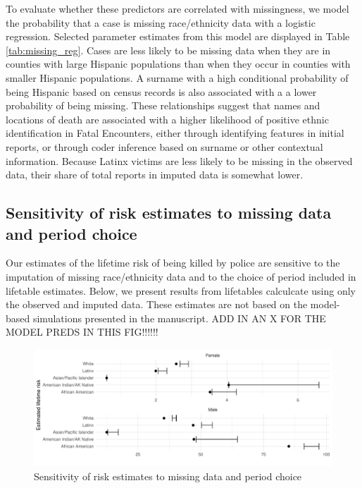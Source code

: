 \documentclass{article}
\begin{document}


To evaluate whether these predictors are correlated with missingness, we model the probability that a case is missing race/ethnicity data with a logistic regression. Selected parameter estimates from this model are displayed in Table \ref{tab:missing_reg}. Cases are less likely to be missing data when they are in counties with large Hispanic populations than when they occur in counties with smaller Hispanic populations. A surname with a high conditional probability of being Hispanic based on census records is also associated with a a lower probability of being missing. These relationships suggest that names and locations of death are associated with a higher likelihood of positive ethnic identification in Fatal Encounters, either through identifying features in initial reports, or through coder inference based on surname or other contextual information. Because Latinx victims are less likely to be missing in the observed data, their share of total reports in imputed data is somewhat lower. 

\subsection{Sensitivity of risk estimates to missing data and period choice}

Our estimates of the lifetime risk of being killed by police are sensitive to the imputation of missing race/ethnicity data and to the choice of period included in lifetable estimates. Below, we present results from lifetables calculcate using only the observed and imputed data. These estimates are not based on the model-based simulations presented in the manuscript. ADD IN AN X FOR THE MODEL PREDS IN THIS FIG!!!!!!

\begin{figure}[H]
	\includegraphics[width=\linewidth]{vis/imp_period_sensitivity.pdf}
	\caption{Sensitivity of risk estimates to missing data and period choice}
\end{figure}
\end{document}
